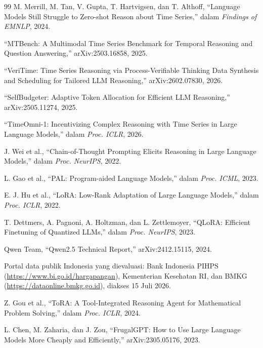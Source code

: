 \documentclass[10pt,a4paper,twocolumn]{article}
\begin{document}
\begin{thebibliography}{99}
\footnotesize
\setlength{\itemsep}{0pt}
\setlength{\parsep}{0pt}
M. Merrill, M. Tan, V. Gupta, T. Hartvigsen, dan T. Althoff, ``Language Models
Still Struggle to Zero-shot Reason about Time Series,'' dalam \textit{Findings
of EMNLP}, 2024.

``MTBench: A Multimodal Time Series Benchmark for Temporal Reasoning and
Question Answering,'' arXiv:2503.16858, 2025.

``VeriTime: Time Series Reasoning via Process-Verifiable Thinking Data Synthesis
and Scheduling for Tailored LLM Reasoning,'' arXiv:2602.07830, 2026.

``SelfBudgeter: Adaptive Token Allocation for Efficient LLM Reasoning,''
arXiv:2505.11274, 2025.

``TimeOmni-1: Incentivizing Complex Reasoning with Time Series in Large Language
Models,'' dalam \textit{Proc. ICLR}, 2026.

J. Wei et al., ``Chain-of-Thought Prompting Elicits Reasoning in Large Language
Models,'' dalam \textit{Proc. NeurIPS}, 2022.

L. Gao et al., ``PAL: Program-aided Language Models,'' dalam \textit{Proc.
ICML}, 2023.

E. J. Hu et al., ``LoRA: Low-Rank Adaptation of Large Language Models,'' dalam
\textit{Proc. ICLR}, 2022.

T. Dettmers, A. Pagnoni, A. Holtzman, dan L. Zettlemoyer, ``QLoRA: Efficient
Finetuning of Quantized LLMs,'' dalam \textit{Proc. NeurIPS}, 2023.

Qwen Team, ``Qwen2.5 Technical Report,'' arXiv:2412.15115, 2024.

Portal data publik Indonesia yang dievaluasi: Bank Indonesia PIHPS
(\url{https://www.bi.go.id/hargapangan}), Kementerian Kesehatan RI, dan BMKG
(\url{https://dataonline.bmkg.go.id}), diakses 15 Juli 2026.

Z. Gou et al., ``ToRA: A Tool-Integrated Reasoning Agent for Mathematical Problem
Solving,'' dalam \textit{Proc. ICLR}, 2024.

L. Chen, M. Zaharia, dan J. Zou, ``FrugalGPT: How to Use Large Language Models
More Cheaply and Efficiently,'' arXiv:2305.05176, 2023.


\end{thebibliography}
\end{document}
